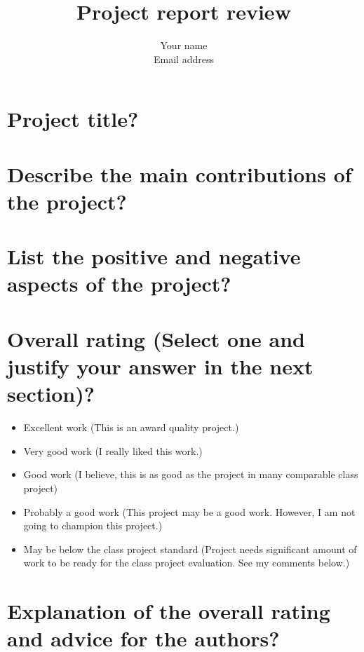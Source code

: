 \documentclass[11pt, oneside]{article}   	%
\title{Project report review}
\author{Your name\\
Email address}
\date{}							%
\begin{document}
\maketitle

\section{Project title?}

\section{Describe the main contributions of the project?}


\section{List the positive and negative aspects of the project?}

\section{Overall rating (Select one and justify your answer in the next section)?}
\begin{itemize}
	\item Excellent work (This is an award quality project.)
	\item Very good work (I really liked this work.)
	\item Good work (I believe, this is as good as the project in many comparable class project)
	\item Probably a good work (This project may be a good work. However, I am not going to champion this project.)
	\item May be below the class project standard (Project needs significant amount of work to be ready for the class project evaluation. See my comments below.)
\end{itemize}


\section{Explanation of the overall rating and advice for the authors?}
\end{document}
